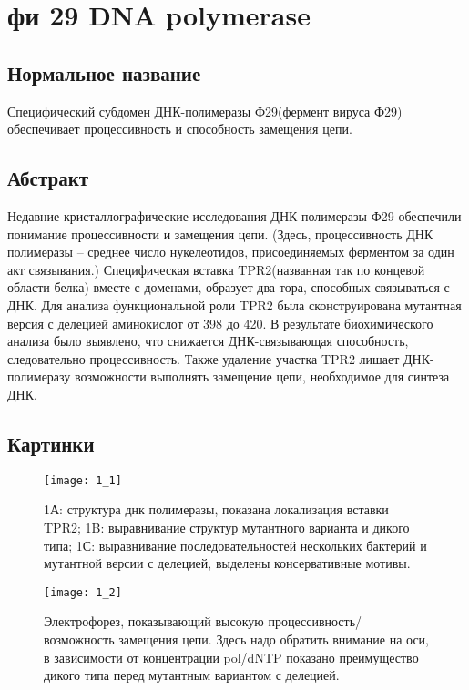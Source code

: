 \section{фи 29 DNA polymerase}

\subsection{Нормальное название}

Специфический субдомен ДНК-полимеразы Ф29(фермент вируса Ф29) обеспечивает процессивность и способность замещения цепи.

\subsection{Абстракт}

Недавние кристаллографические  исследования ДНК-полимеразы Ф29 обеспечили понимание процессивности и замещения цепи. (Здесь, процессивность ДНК полимеразы -- среднее число нукелеотидов, присоединяемых ферментом за один акт связывания.)
Специфическая вставка TPR2(названная так по концевой области белка)  вместе с доменами, образует два тора, способных связываться с ДНК. Для анализа функциональной роли TPR2  была сконструирована мутантная версия с делецией аминокислот от 398 до 420. В результате биохимического анализа было выявлено, что снижается ДНК-связывающая способность, следовательно процессивность. Также удаление участка TPR2 лишает ДНК-полимеразу возможности выполнять замещение цепи, необходимое для синтеза ДНК.

\subsection{Картинки}

\begin{figure}[H]
	\centering
	\texttt{[image: 1\_1]}
	\caption{1А: структура днк полимеразы, показана локализация вставки TPR2; 1B: выравнивание структур мутантного варианта и дикого типа; 1С: выравнивание последовательностей нескольких бактерий и мутантной версии с делецией, выделены консервативные мотивы.}
	\label{fig:1_1}
\end{figure}

\begin{figure}[H]
	\centering
	\texttt{[image: 1\_2]}
	\caption{Электрофорез, показывающий высокую процессивность/возможность замещения цепи. Здесь надо обратить внимание на оси, в зависимости от концентрации pol/dNTP показано преимущество дикого типа перед мутантным вариантом с делецией.}
	\label{fig:1_2}
\end{figure}

